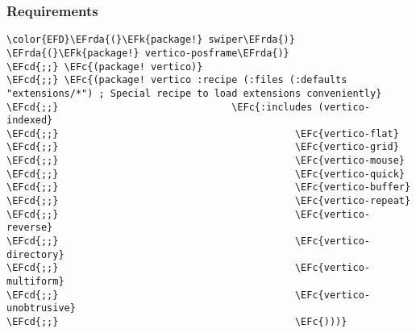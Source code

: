 \documentclass[a4wide,10pt]{article}
\newcommand{\EFc}[1]{\textcolor{EFc}{#1}} %
\newcommand{\EFcd}[1]{\textcolor{EFcd}{#1}} %
\newcommand{\EFk}[1]{\textcolor{EFk}{#1}} %
\newcommand{\EFrda}[1]{\textcolor{EFrda}{#1}} %
\begin{document}
\subsubsection{Requirements}
\label{sec:orga49a6d0}
\begin{Code}
\begin{Verbatim}
\color{EFD}\EFrda{(}\EFk{package!} swiper\EFrda{)}
\EFrda{(}\EFk{package!} vertico-posframe\EFrda{)}
\EFcd{;;} \EFc{(package! vertico)}
\EFcd{;;} \EFc{(package! vertico :recipe (:files (:defaults "extensions/*") ; Special recipe to load extensions conveniently}
\EFcd{;;}                              \EFc{:includes (vertico-indexed}
\EFcd{;;}                                         \EFc{vertico-flat}
\EFcd{;;}                                         \EFc{vertico-grid}
\EFcd{;;}                                         \EFc{vertico-mouse}
\EFcd{;;}                                         \EFc{vertico-quick}
\EFcd{;;}                                         \EFc{vertico-buffer}
\EFcd{;;}                                         \EFc{vertico-repeat}
\EFcd{;;}                                         \EFc{vertico-reverse}
\EFcd{;;}                                         \EFc{vertico-directory}
\EFcd{;;}                                         \EFc{vertico-multiform}
\EFcd{;;}                                         \EFc{vertico-unobtrusive}
\EFcd{;;}                                         \EFc{)))}
\end{Verbatim}
\end{Code}
\end{document}
